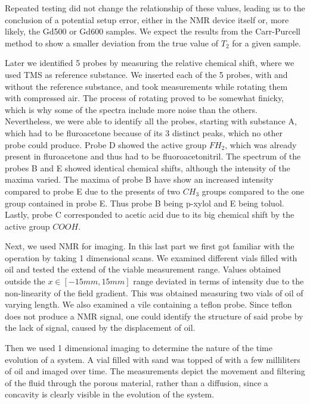 \documentclass[11 pt]{article}
\begin{document}
Repeated testing did not change the relationship of these values, leading us to the conclusion of a potential setup error, either in the NMR device itself or, more likely, the Gd500 or Gd600 samples.  We expect the results from the Carr-Purcell method to show a smaller deviation from the true value of $T_2$ for a given sample.



 Later we identified 5 probes by measuring the relative chemical shift, where we used TMS as reference substance.
 We inserted each of the 5 probes, with and without the reference substance, and took measurements while rotating them with compressed air. The process of rotating proved to be somewhat finicky, which is why some of the spectra include more noise than the others. Nevertheless, we were able to identify all the probes, starting with substance A, which had to be fluroacetone because of its 3 distinct peaks, which no other probe could produce. Probe D showed the active group $FH_2$, which was already present in fluroacetone and thus had to be fluoroacetonitril. The spectrum of the probes B and E showed identical chemical shifts, although the intensity of the maxima varied. The maxima of probe B have show an increased intensity compared to probe E due to the presents of two $CH_3$ groups compared to the one group contained in probe E. Thus probe B being p-xylol and E being toluol. Lastly, probe C corresponded to acetic acid due to its big chemical shift by the active group $COOH$.



  Next, we used NMR for imaging. In this last part we first got familiar with the operation by taking 1 dimensional scans. 
We examined different vials filled with oil and tested the extend of the viable measurement range. Values obtained outside the $x\in\left[-15mm, 15mm\right]$ range deviated in terms of intensity due to the non-linearity of the field gradient. This was obtained measuring two vials of oil of varying length. We also examined a vile containing a teflon probe. Since teflon does not produce a NMR signal, one could identify the structure of said probe by the lack of signal, caused by the displacement of oil.
  
Then we used 1 dimensional imaging to determine the nature of the time evolution of a system. A vial filled with sand was topped of with a few milliliters of oil and imaged over time. The measurements depict the movement and filtering of the fluid through the porous material, rather than a diffusion, since a concavity is clearly visible in the evolution of the system.
\end{document}
